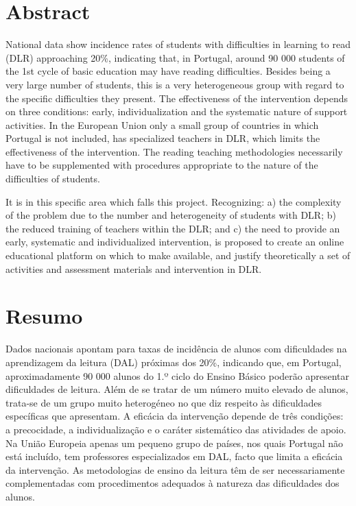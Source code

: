 \documentclass[
  oneside,
  11pt, a4paper,
  footinclude=true,
  headinclude=true,
  cleardoublepage=empty
]{scrbook}
\author{André Filipe Pinto Vieira}
\date{\myear} %
\begin{document}
	
    
	
\rm
	\cleardoublepage
	\setcounter{page}{1}
	
\chapter*{Abstract}
National data show incidence rates of students with difficulties in learning to read (DLR) approaching 20\%, indicating that, in Portugal, around 90 000 students of the 1st cycle of basic education may have reading difficulties. Besides being a very large number of students, this is a very heterogeneous group with regard to the specific difficulties they present. The effectiveness of the intervention depends on three conditions: early, individualization and the systematic nature of support activities. In the European Union only a small group of countries in which Portugal is not included, has specialized teachers in DLR, which limits the effectiveness of the intervention. The reading teaching methodologies necessarily have to be supplemented with procedures appropriate to the nature of the difficulties of students.

It is in this specific area which falls this project. Recognizing: a) the complexity of the problem due to the number and heterogeneity of students with DLR; b) the reduced training of teachers within the DLR; and c) the need to provide an early, systematic and individualized intervention, is proposed to create an online educational platform on which to make available, and justify theoretically a set of activities and assessment materials and intervention in DLR.
\cleardoublepage

\chapter*{Resumo}

Dados nacionais apontam para taxas de incidência de alunos com dificuldades na aprendizagem da leitura (DAL) próximas dos 20\%, indicando que, em Portugal, aproximadamente 90 000 alunos do  1.º ciclo  do Ensino  Básico  poderão apresentar dificuldades de leitura. Além de se tratar de um número muito elevado de alunos, trata-se de um grupo muito heterogéneo no que diz respeito às dificuldades específicas que apresentam. A eficácia da intervenção depende de três condições: a precocidade, a individualização e o caráter sistemático das atividades de apoio. Na União Europeia apenas um pequeno grupo de países, nos quais Portugal não está incluído, tem professores especializados em DAL, facto que limita a eficácia da intervenção. As metodologias de ensino  da  leitura  têm  de  ser  necessariamente  complementadas  com procedimentos adequados à natureza das dificuldades dos alunos.
\end{document}
